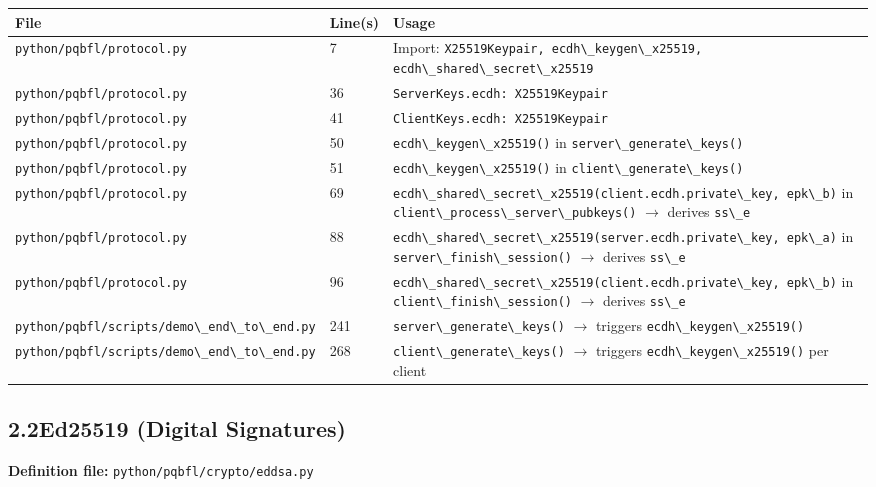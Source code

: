 \documentclass[11pt,a4paper]{article}
\newcommand{\code}[1]{\lstinline[basicstyle=\ttfamily\small]!#1!}
\begin{document}
\begin{longtable}{L{5.5cm} L{1.8cm} L{7cm}}
\toprule
\textbf{File} & \textbf{Line(s)} & \textbf{Usage} \\
\midrule
\endhead
\bottomrule
\endfoot
\code{python/pqbfl/protocol.py}              & 7       & Import: \code{X25519Keypair, ecdh\_keygen\_x25519, ecdh\_shared\_secret\_x25519} \\
\code{python/pqbfl/protocol.py}              & 36      & \code{ServerKeys.ecdh: X25519Keypair} \\
\code{python/pqbfl/protocol.py}              & 41      & \code{ClientKeys.ecdh: X25519Keypair} \\
\code{python/pqbfl/protocol.py}              & 50      & \code{ecdh\_keygen\_x25519()} in \code{server\_generate\_keys()} \\
\code{python/pqbfl/protocol.py}              & 51      & \code{ecdh\_keygen\_x25519()} in \code{client\_generate\_keys()} \\
\code{python/pqbfl/protocol.py}              & 69      & \code{ecdh\_shared\_secret\_x25519(client.ecdh.private\_key, epk\_b)} in \code{client\_process\_server\_pubkeys()} $\to$ derives \code{ss\_e} \\
\code{python/pqbfl/protocol.py}              & 88      & \code{ecdh\_shared\_secret\_x25519(server.ecdh.private\_key, epk\_a)} in \code{server\_finish\_session()} $\to$ derives \code{ss\_e} \\
\code{python/pqbfl/protocol.py}              & 96      & \code{ecdh\_shared\_secret\_x25519(client.ecdh.private\_key, epk\_b)} in \code{client\_finish\_session()} $\to$ derives \code{ss\_e} \\
\code{python/pqbfl/scripts/demo\_end\_to\_end.py} & 241     & \code{server\_generate\_keys()} $\to$ triggers \code{ecdh\_keygen\_x25519()} \\
\code{python/pqbfl/scripts/demo\_end\_to\_end.py} & 268     & \code{client\_generate\_keys()} $\to$ triggers \code{ecdh\_keygen\_x25519()} per client \\
\end{longtable}

\subsection{2.2\quad Ed25519 (Digital Signatures)}

\textbf{Definition file:} \code{python/pqbfl/crypto/eddsa.py}
\end{document}
